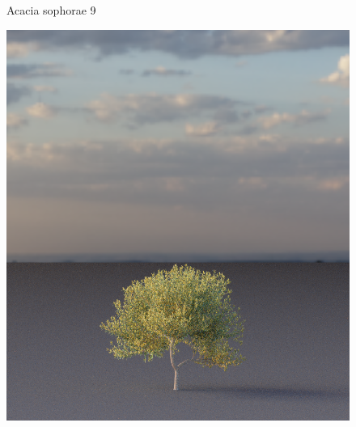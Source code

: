 \begin{figure}[t]
\begin{center}
        \begin{minipage}[c]{0.24\textwidth}
            \begin{flushleft}
                Acacia sophorae 9
            \end{flushleft}
        \end{minipage}
        \begin{minipage}[c]{0.24\textwidth}
            \includegraphics[valign=c, width=\linewidth]{img/OC41_9_mesh.png}
        \end{minipage}
        \begin{minipage}[c]{0.24\textwidth}

\end{minipage}
\end{center}
\end{figure}
